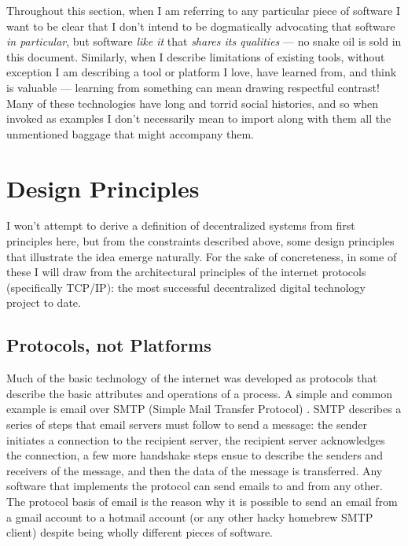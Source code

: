 Throughout this section, when I am referring to any particular piece of
software I want to be clear that I don't intend to be dogmatically
advocating that software \emph{in particular}, but software \emph{like
it} that \emph{shares its qualities} --- no snake oil is sold in this
document. Similarly, when I describe limitations of existing tools,
without exception I am describing a tool or platform I love, have
learned from, and think is valuable --- learning from something can mean
drawing respectful contrast! Many of these technologies have long and
torrid social histories, and so when invoked as examples I don't
necessarily mean to import along with them all the unmentioned baggage
that might accompany them.

\hypertarget{design-principles}{%
\section{Design Principles}\label{design-principles}}

I won't attempt to derive a definition of decentralized systems from
first principles here, but from the constraints described above, some
design principles that illustrate the idea emerge naturally. For the
sake of concreteness, in some of these I will draw from the
architectural principles of the internet protocols (specifically
TCP/IP): the most successful decentralized digital technology project to
date.

\hypertarget{protocols-not-platforms}{%
\subsection{Protocols, not Platforms}\label{protocols-not-platforms}}

Much of the basic technology of the internet was developed as protocols
that describe the basic attributes and operations of a process. A simple
and common example is email over SMTP (Simple Mail Transfer Protocol)
\citep{Rfc5321SimpleMail} . SMTP describes a series of steps that
email servers must follow to send a message: the sender initiates a
connection to the recipient server, the recipient server acknowledges
the connection, a few more handshake steps ensue to describe the senders
and receivers of the message, and then the data of the message is
transferred. Any software that implements the protocol can send emails
to and from any other. The protocol basis of email is the reason why it
is possible to send an email from a gmail account to a hotmail account
(or any other hacky homebrew SMTP client) despite being wholly different
pieces of software.

